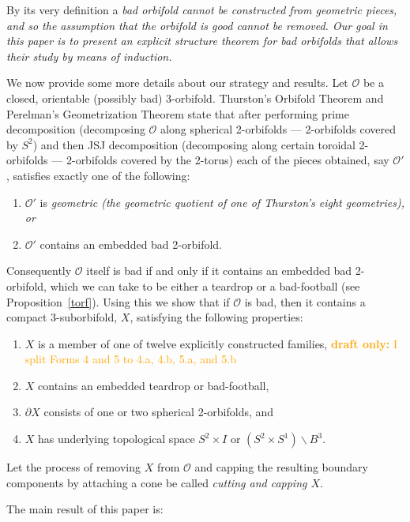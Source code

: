 \documentclass[12pt,reqno]{amsart}
\theoremstyle{plain}
\theoremstyle{definition}
\numberwithin{subcase}{case}
\theoremstyle{plain}
\theoremstyle{definition}
\newcommand{\OO}{\mathcal{O}}
\begin{document}
By its very definition a \em bad orbifold \em cannot be constructed from geometric pieces, and so the assumption that the orbifold is good cannot be removed. Our goal in this paper is to present an explicit structure theorem for bad orbifolds that allows their study by means of induction.

We now provide some more details about our strategy and results. Let $\OO$ be a closed, orientable (possibly bad) 3-orbifold. Thurston's Orbifold Theorem and Perelman's Geometrization Theorem state that after performing prime decomposition (decomposing $\OO$ along spherical 2-orbifolds --- 2-orbifolds covered by \(S^{2}\)) 
and then JSJ decomposition (decomposing along certain toroidal 2-orbifolds --- 2-orbifolds covered by the 2-torus) 
each of the pieces obtained, say \(\OO'\), satisfies exactly one of the following:
\begin{enumerate}
\item \(\OO'\) is \em geometric \em (the geometric quotient of one of Thurston's eight geometries), or
\item \(\OO'\) contains an embedded bad 2-orbifold.
\end{enumerate}
Consequently \(\OO\) itself is bad if and only if it contains an embedded bad 2-orbifold, which we can take to be either a teardrop or a bad-football (see Proposition~\ref{torf}). 
Using this we show that if $\OO$ is bad, then it contains a compact 3-suborbifold, $X$, satisfying the following properties: 
\begin{enumerate}
\item $X$ is a member of one of 
twelve explicitly constructed families, 
\ifDraft
\textcolor{orange}{\tiny {\bf draft only:} I split Forms 4 and 5 to 4.a, 4.b, 5.a, and 5.b} 
\fi
\item $X$ contains an embedded teardrop or bad-football, 
\item $\partial X$ consists of one or two spherical 2-orbifolds, and 
\item $X$ has underlying topological space $S^2\times I$ or $(S^2\times S^1)\backslash B^3$.
\end{enumerate}
\noindent Let the process of removing $X$ from $\OO$ and capping the resulting boundary components by attaching a cone be called \textit{cutting and capping $X$}.

The main result of this paper is: 
\end{document}
